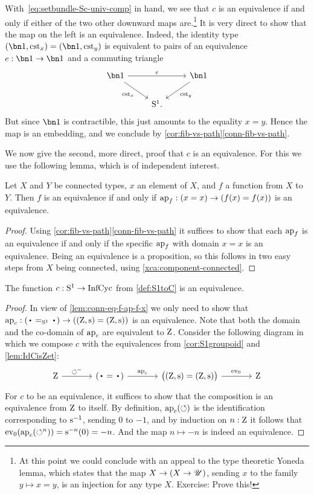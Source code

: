 With~\eqref{eq:setbundle-Sc-univ-comp} in hand, we see that $c$ is an equivalence
if and only if either of the two other downward maps are.\footnote{%
  At this point we could conclude with an appeal to the type theoretic Yoneda lemma,
  which states that the map $X \to (X \to {\mathscr{U}})$,
  sending $x$ to the family $y \mapsto x=y$,
  is an injection for any type $X$.
  Exercise: Prove this!}
It is very direct to show that the map on the left is an equivalence.
Indeed, the identity type $(\bn 1,\cst x)=(\bn 1,\cst y)$
is equivalent to pairs of an equivalence $e : \bn 1 \to \bn 1$ and a commuting triangle
\[
  \begin{tikzcd}
    \bn 1 \ar[rr,"e"]\ar[dr,"\cst x"'] & & \bn 1\ar[dl,"\cst y"] \\
    & \Sc. &
  \end{tikzcd}
\]
But since $\bn 1$ is contractible, this just amounts to the equality $x=y$.
Hence the map is an embedding, and we conclude by \cref{cor:fib-vs-path}\ref{conn-fib-vs-path}.

We now give the second, more direct, proof that $c$ is an equivalence.
For this we use the following lemma, which is of independent interest.
\begin{lemma}\label{lem:conn-eq-f-ap-f-x}
Let $X$ and $Y$ be connected types, $x$ an element of $X$,
and $f$ a function from $X$ to $Y$. Then $f$ is an equivalence
if and only if $\ap{f}: (x=x) \to (f(x)=f(x))$ is an equivalence.
\end{lemma}
\begin{proof}
Using \cref{cor:fib-vs-path}\ref{conn-fib-vs-path} it suffices to show that
each $\ap{f}$ is an equivalence if and only if the specific $\ap{f}$ with
domain $x=x$ is an equivalence. Being an equivalence is a proposition,
so this follows in two easy steps from $X$ being connected,
using \cref{xca:component-connected}.
\end{proof}

\begin{theorem}\label{thm:S1bysymmetries}
  The function $c:{\mathrm{S}^1}\to\mathrm{InfCyc}$ from \cref{def:S1toC} is an equivalence.
\end{theorem}
\begin{proof}
  In view of \cref{lem:conn-eq-f-ap-f-x} we only need to show that
$\ap{c}:(\base=_{\Sc}\base)\to((\zet,\zs)=(\zet,\zs))$ is an equivalence.
Note that both the domain and the co-domain of $\ap{c}$ are equivalent to $\mathrm{Z}$.
Consider the following diagram in which we compose $c$ with the equivalences
from \cref{cor:S1groupoid} and \cref{lem:IdCisZet}:
\[
  \begin{tikzcd}[column sep=large]
    \zet\ar[r,"\Sloop^-"] &
    (\base=\base)\ar[r,"\ap{c}"] &
    \bigl((\zet,\zs)=(\zet,\zs)\bigr)\ar[r,"\ev_0\vphantom{\ap{c}}"] &
    \zet
  \end{tikzcd}
\]
For $c$ to be an equivalence, it suffices to show that the composition
is an equivalence from $\mathrm{Z}$ to itself.
By definition, $\ap{c}(\Sloop)$ is the identification
corresponding to $\inv\zs$, sending $0$ to $-1$,
and by induction on $n:\mathrm{Z}$ it follows that
$\ev_0(\ap{c}(\Sloop^n)) = \zs^{-n}(0) = -n$.
And the map $n \mapsto -n$ is indeed an equivalence.
\end{proof}

